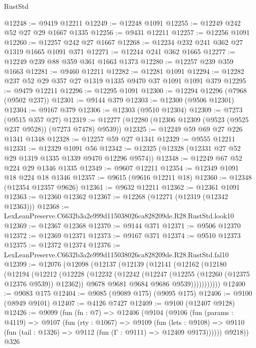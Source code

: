 \begin{lexlean}{RustStd}
\begin{coremodule}
@12248 := @9419 @12211
@12249 := @12248 @1091
@12255 := @12249 @242 @52 @27 @29 @1667 @1335
@12256 := @9431 @12211
@12257 := @12256 @1091
@12260 := @12257 @242 @27 @1667
@12268 := @12234 @232 @241 @362 @27 @1319 @1665 @1091 @371
@12271 := @12244 @241 @362 @1665
@12277 := @12249 @239 @88 @359 @361 @1663 @1373
@12280 := @12257 @239 @359 @1663
@12281 := @9460 @12211
@12282 := @12281 @1091
@12294 := @12282 @237 @52 @29 @357 @27 @1319 @1335 @9470 @37 @1091 @1091 @379
@12295 := @9479 @12211
@12296 := @12295 @1091
@12300 := @12294 @12296 (@7968 (@9502 @237))
@12301 := @9144 @379
@12303 := @12300 (@9506 @12301)
@12304 := @9167 @379
@12306 := @12303 (@9510 @12304)
@12309 := @7273 (@9515 @357 @27)
@12319 := @12277 (@12280 (@12306 @12309 (@9523 (@9525 @237 @9528)) (@7273 @7478) @9539))
@12325 := @12249 @59 @69 @27 @226 @1341 @1348
@12328 := @12257 @59 @27 @1341
@12329 := @9555 @12211
@12331 := @12329 @1091 @56
@12342 := @12325 (@12328 (@12331 @27 @52 @29 @1319 @1335 @1339 @9470 @12296 @9574))
@12348 := @12249 @67 @52 @224 @29 @1346 @1335
@12349 := @9607 @12211
@12354 := @12349 @1091 @18 @224 @18 @1346
@12357 := @9615 (@9616 @12211 @18)
@12360 := @12348 (@12354 @12357 @9626)
@12361 := @9632 @12211
@12362 := @12361 @1091
@12363 := @12360 @12362
@12367 := @12268 (@12271 (@12319 (@12342 @12363)))
@12368 := LexLeanPreserve.C6632b3a2e999d115038026ca828209de.R28.RustStd.look10
@12369 := @12367 @12368
@12370 := @9144 @371
@12371 := @9506 @12370
@12372 := @12369 @12371
@12373 := @9167 @371
@12374 := @9510 @12373
@12375 := @12372 @12374
@12376 := LexLeanPreserve.C6632b3a2e999d115038026ca828209de.R28.RustStd.fal10
@12399 := @12076
    (@12098
      (@12137
        (@12139
          (@12141
            (@12162
              (@12180
                (@12194
                  (@12212
                    (@12228
                      (@12232
                        (@12242
                          (@12247 (@12255 (@12260 (@12375 @12376 @9539)) @12362))
                          @9678
                          @9681
                          @9684
                          @9686
                          @9539)))))))))))
@12400 := @9083 @175
@12404 := @9085 (@9089 @175) (@9095 @175)
@12406 := @9100 (@8949 @9101)
@12407 := @4126 @7427
@12409 := @9100 (@12407 @9128)
@12426 := @9099
    (fun (fn : @7) =>
    @12406
      (@9104
        (@9106
          (fun (params : @4119) =>
          @9107
            (fun (rty : @1067) =>
            @9109
              (fun (lets : @9108) =>
              @9110 (fun (tail : @1326) => @9112 (fun (Γ : @9111) => @12409 @9173))))))
        @9218))
    @326

\end{coremodule}
\end{lexlean}
